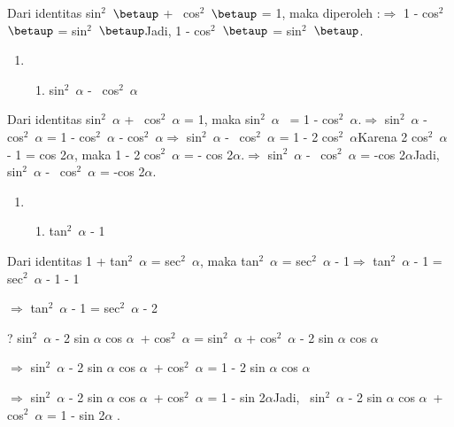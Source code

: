 \documentclass[11pt,fleqn]{book} %
\begin{document}
\noindent Dari identitas sin${}^{2}$~$\betaup$ +~ cos${}^{2}$~$\betaup$ = 1, maka diperoleh :$\mathrm{\Rightarrow }$ 1 - cos${}^{2}$~$\betaup$ = sin${}^{2}$~$\betaup$Jadi, 1 - cos${}^{2}$~$\betaup$ = sin${}^{2}$~$\betaup$.

\begin{enumerate}
\item \begin{enumerate}
\item  sin${}^{2}$~$\alpha$ -~ cos${}^{2}$~$\alpha$
\end{enumerate}
\end{enumerate}

\noindent Dari identitas sin${}^{2}$~$\alpha$ +~ cos${}^{2}$~$\alpha$ = 1, maka sin${}^{2}$~$\alpha$~ = 1 - cos${}^{2}$~$\alpha$.$\mathrm{\Rightarrow }$ sin${}^{2}$~$\alpha$ -~ cos${}^{2}$~$\alpha$ = 1 - cos${}^{2}$~$\alpha$ - cos${}^{2}$~$\alpha$$\mathrm{\Rightarrow }$ sin${}^{2}$~$\alpha$ -~ cos${}^{2}$~$\alpha$ = 1 - 2 cos${}^{2}$~$\alpha$Karena 2 cos${}^{2}$~$\alpha$ - 1 = cos 2$\alpha$, maka 1 - 2 cos${}^{2}$~$\alpha$ = - cos 2$\alpha$.$\mathrm{\Rightarrow }$ sin${}^{2}$~$\alpha$ -~ cos${}^{2}$~$\alpha$ = -cos 2$\alpha$Jadi, sin${}^{2}$~$\alpha$ -~ cos${}^{2}$~$\alpha$ = -cos 2$\alpha$.

\begin{enumerate}
\item \begin{enumerate}
\item  tan${}^{2}$~$\alpha$ - 1
\end{enumerate}
\end{enumerate}

\noindent Dari identitas 1 + tan${}^{2}$~$\alpha$ = sec${}^{2}$~$\alpha$, maka tan${}^{2}$~$\alpha$ = sec${}^{2}$~$\alpha$ - 1$\mathrm{\Rightarrow }$ tan${}^{2}$~$\alpha$ - 1 = sec${}^{2}$~$\alpha$ - 1 - 1

\noindent $\mathrm{\Rightarrow }$ tan${}^{2}$~$\alpha$ - 1 = sec${}^{2}$~$\alpha$ - 2 

\noindent ?  sin${}^{2}$~$\alpha$ - 2 sin $\alpha$ cos $\alpha$~+ cos${}^{2}$~$\alpha$ = sin${}^{2}$~$\alpha$ + cos${}^{2}$~$\alpha$ - 2 sin $\alpha$ cos $\alpha$

\noindent $\mathrm{\Rightarrow }$ sin${}^{2}$~$\alpha$ - 2 sin $\alpha$ cos $\alpha$~+ cos${}^{2}$~$\alpha$ = 1 - 2 sin $\alpha$ cos $\alpha$

\noindent $\mathrm{\Rightarrow }$ sin${}^{2}$~$\alpha$ - 2 sin $\alpha$ cos $\alpha$~+ cos${}^{2}$~$\alpha$ = 1 - sin 2$\alpha$Jadi,~ sin${}^{2}$~$\alpha$ - 2 sin $\alpha$ cos $\alpha$~+ cos${}^{2}$~$\alpha$ = 1 - sin 2$\alpha$ .
\end{document}
